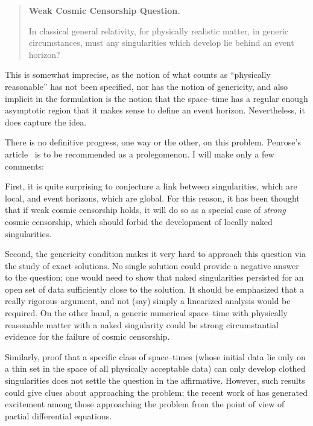\documentclass[
%
draft    %
,numberedheadings 
,bibliocites
  ]
  {aipproc}
\begin{document}
\begin{quote}
\begin{center}
{\bf Weak Cosmic Censorship Question.}
\end{center}\nobreak
In classical general relativity, for physically realistic matter, in generic circumstances, must any singularities which develop lie behind an event horizon?
\end{quote}

This is somewhat imprecise, as the notion of what counts as ``physically reasonable'' has not been specified, nor has the notion of genericity, and also implicit in the formulation is the notion that the space--time has a regular enough asymptotic region that it makes sense to define an event horizon.  Nevertheless, it does capture the idea.  

There is no definitive progress, one way or the other, on this problem.  Penrose's article~\citep{Penrose:1999} is to be recommended as a prolegomenon.  I will make only a few comments:

First, it is quite surprising to conjecture a link between singularities, which are local, and event horizons, which are global.  For this reason, it has been thought that if weak cosmic censorship holds, it will do so as a special case of {\em strong} cosmic censorship, which should forbid the development of locally naked singularities.

Second, the genericity condition makes it very hard to approach this question via the study of exact solutions.  No single solution could provide a negative answer to the question; one would need to show that naked singularities persisted for an open set of data sufficiently close to the solution.  It should be emphasized that a really rigorous argument, and not (say) simply a linearized analysis would be required.
On the other hand, a generic numerical space--time with physically reasonable matter with a naked singularity could be strong circumstantial evidence for the failure of cosmic censorship.

Similarly, proof that a specific class of space--times (whose initial data lie only on a thin set in the space of all physically acceptable data) can  only develop clothed singularities does not settle the question in the affirmative.  However, such results could give clues about approaching the problem; the recent work of \citet{Ringstrom:2008} has generated excitement among those approaching the problem from the point of view of partial differential equations.
\end{document}

